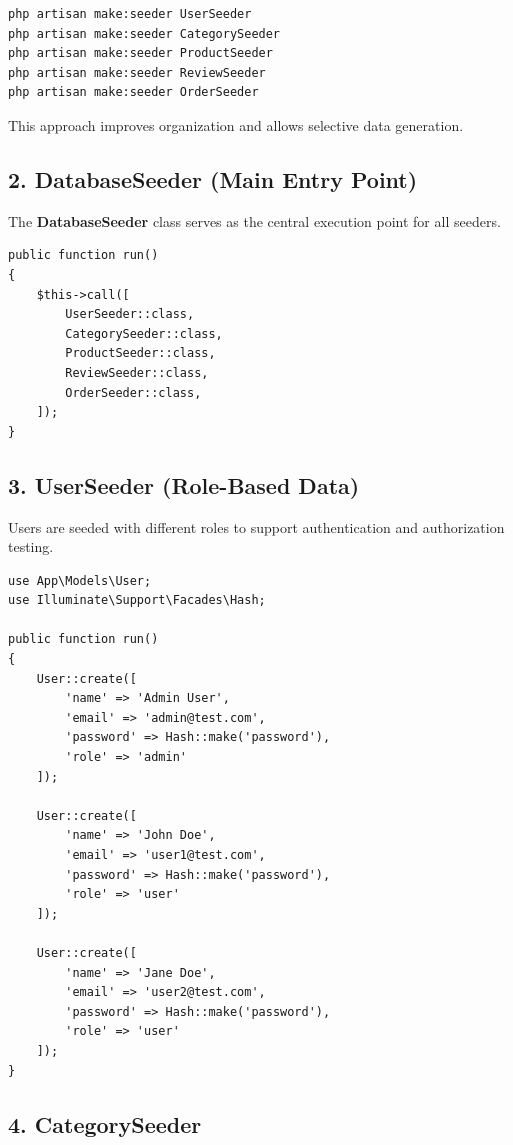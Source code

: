 \documentclass[12pt,a4paper]{article}
\begin{document}
\begin{verbatim}
php artisan make:seeder UserSeeder
php artisan make:seeder CategorySeeder
php artisan make:seeder ProductSeeder
php artisan make:seeder ReviewSeeder
php artisan make:seeder OrderSeeder
\end{verbatim}

This approach improves organization and allows selective data generation.

\subsection{2. DatabaseSeeder (Main Entry Point)}

The \textbf{DatabaseSeeder} class serves as the central execution point for all seeders.

\begin{verbatim}
public function run()
{
    $this->call([
        UserSeeder::class,
        CategorySeeder::class,
        ProductSeeder::class,
        ReviewSeeder::class,
        OrderSeeder::class,
    ]);
}
\end{verbatim}

\subsection{3. UserSeeder (Role-Based Data)}

Users are seeded with different roles to support authentication and authorization testing.

\begin{verbatim}
use App\Models\User;
use Illuminate\Support\Facades\Hash;

public function run()
{
    User::create([
        'name' => 'Admin User',
        'email' => 'admin@test.com',
        'password' => Hash::make('password'),
        'role' => 'admin'
    ]);

    User::create([
        'name' => 'John Doe',
        'email' => 'user1@test.com',
        'password' => Hash::make('password'),
        'role' => 'user'
    ]);

    User::create([
        'name' => 'Jane Doe',
        'email' => 'user2@test.com',
        'password' => Hash::make('password'),
        'role' => 'user'
    ]);
}
\end{verbatim}

\subsection{4. CategorySeeder}
\end{document}

